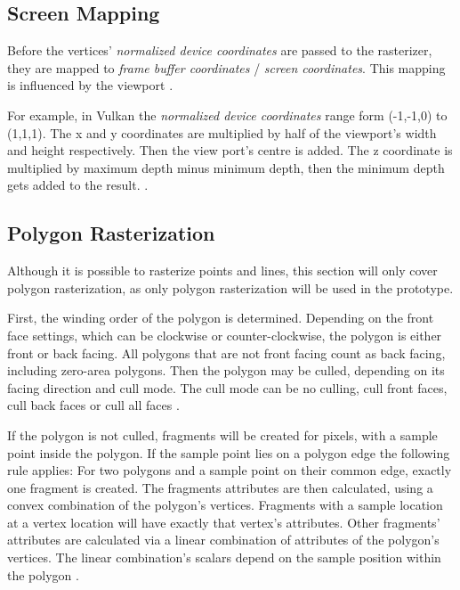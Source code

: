 \subsection{Screen Mapping}
Before the vertices' \textit{normalized device coordinates} are passed to the rasterizer, they are mapped to \textit{frame buffer coordinates} / \textit{screen coordinates}. This mapping is influenced by the viewport \cite{akine:2018:realtime, khronos:vulkan:spec1.1}.

For example, in Vulkan the \textit{normalized device coordinates} range form (-1,-1,0) to (1,1,1). The x and y coordinates are multiplied by half of the viewport's width and height respectively. Then the view port's centre is added. The z coordinate is multiplied by maximum depth minus minimum depth, then the minimum depth gets added to the result. \cite{khronos:vulkan:spec1.1}.

\subsection{Polygon Rasterization}
Although it is possible to rasterize points and lines, this section will only cover polygon rasterization, as only polygon rasterization will be used in the prototype.

First, the winding order of the polygon is determined. Depending on the front face settings, which can be clockwise or counter-clockwise, the polygon is either front or back facing. All polygons that are not front facing count as back facing, including zero-area polygons. Then the polygon may be culled, depending on its facing direction and cull mode. The cull mode can be no culling, cull front faces, cull back faces or cull all faces \cite{akine:2018:realtime, khronos:vulkan:spec1.1}.

If the polygon is not culled, fragments will be created for pixels, with a sample point inside the polygon. If the sample point lies on a polygon edge the following rule applies: For two polygons and a sample point on their common edge, exactly one fragment is created. The fragments attributes are then calculated, using a convex combination of the polygon's vertices. Fragments with a sample location at a vertex location will have exactly that vertex's attributes. Other fragments' attributes are calculated via a linear combination of attributes of the polygon's vertices. The linear combination's scalars depend on the sample position within the polygon \cite{akine:2018:realtime, khronos:vulkan:spec1.1}.

